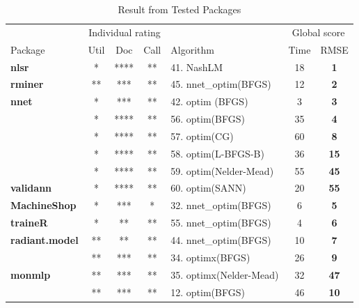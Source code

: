 \begin{Schunk}
\begin{table}

\caption{\label{tab:unnamed-chunk-3}Result from Tested Packages}
\centering
\fontsize{7}{9}\selectfont
\begin{tabular}[t]{>{}lccclc>{}c}
\toprule
\multicolumn{1}{c}{ } & \multicolumn{3}{c}{Individual rating} & \multicolumn{1}{c}{ } & \multicolumn{2}{c}{Global score} \\
\cmidrule(l{3pt}r{3pt}){2-4} \cmidrule(l{3pt}r{3pt}){6-7}
Package & Util & Doc & Call & Algorithm & Time & RMSE\\
\midrule
\textbf{nlsr} & * & **** & ** & 41. NashLM & 18 & \textbf{1}\\
\cmidrule{1-7}
\textbf{rminer} & ** & *** & ** & 45. nnet\_optim(BFGS) & 12 & \textbf{2}\\
\cmidrule{1-7}
\textbf{nnet} & * & *** & ** & 42. optim (BFGS) & 3 & \textbf{3}\\
\cmidrule{1-7}
 & * & **** & ** & 56. optim(BFGS) & 35 & \textbf{4}\\

 & * & **** & ** & 57. optim(CG) & 60 & \textbf{8}\\

 & * & **** & ** & 58. optim(L-BFGS-B) & 36 & \textbf{15}\\

 & * & **** & ** & 59. optim(Nelder-Mead) & 55 & \textbf{45}\\

\multirow{-5}{*}{\raggedright\arraybackslash \textbf{validann}} & * & **** & ** & 60. optim(SANN) & 20 & \textbf{55}\\
\cmidrule{1-7}
\textbf{MachineShop} & * & *** & * & 32. nnet\_optim(BFGS) & 6 & \textbf{5}\\
\cmidrule{1-7}
\textbf{traineR} & * & ** & ** & 55. nnet\_optim(BFGS) & 4 & \textbf{6}\\
\cmidrule{1-7}
\textbf{radiant.model} & ** & ** & ** & 44. nnet\_optim(BFGS) & 10 & \textbf{7}\\
\cmidrule{1-7}
 & ** & *** & ** & 34. optimx(BFGS) & 26 & \textbf{9}\\

\multirow{-2}{*}{\raggedright\arraybackslash \textbf{monmlp}} & ** & *** & ** & 35. optimx(Nelder-Mead) & 32 & \textbf{47}\\
\cmidrule{1-7}
 & ** & *** & ** & 12. optim(BFGS) & 46 & \textbf{10}\\


\end{tabular}
\end{table}
\end{Schunk}
